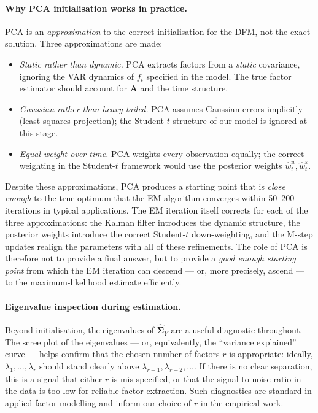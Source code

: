 \documentclass[11pt, a4paper, oneside]{article}
\newcommand{\mA}{\mathbf{A}}
\begin{document}
\paragraph{Why PCA initialisation works in practice.}
PCA is an \emph{approximation} to the correct initialisation for the
DFM, not the exact solution. Three approximations are made:
\begin{itemize}[leftmargin=1.5em, itemsep=3pt]
    \item \emph{Static rather than dynamic.} PCA extracts factors
          from a \emph{static} covariance, ignoring the VAR dynamics
          of $f_t$ specified in the model. The true factor estimator
          should account for $\mA$ and the time structure.
    \item \emph{Gaussian rather than heavy-tailed.} PCA assumes
          Gaussian errors implicitly (least-squares projection); the
          Student-$t$ structure of our model is ignored at this
          stage.
    \item \emph{Equal-weight over time.} PCA weights every observation
          equally; the correct weighting in the Student-$t$ framework
          would use the posterior weights $\hat{w}^u_t, \hat{w}^\varepsilon_t$.
\end{itemize}
Despite these approximations, PCA produces a starting point that is
\emph{close enough} to the true optimum that the EM algorithm
converges within 50--200 iterations in typical applications. The
EM iteration itself corrects for each of the three approximations:
the Kalman filter introduces the dynamic structure, the posterior
weights introduce the correct Student-$t$ down-weighting, and the
M-step updates realign the parameters with all of these refinements.
The role of PCA is therefore not to provide a final answer, but to
provide a \emph{good enough starting point} from which the EM
iteration can descend — or, more precisely, ascend — to the
maximum-likelihood estimate efficiently.

\paragraph{Eigenvalue inspection during estimation.}
Beyond initialisation, the eigenvalues of
$\widehat{\boldsymbol{\Sigma}}_Y$ are a useful diagnostic throughout.
The scree plot of the eigenvalues — or, equivalently, the ``variance
explained'' curve — helps confirm that the chosen number of factors
$r$ is appropriate: ideally, $\lambda_1, \ldots, \lambda_r$ should
stand clearly above $\lambda_{r+1}, \lambda_{r+2}, \ldots$. If there
is no clear separation, this is a signal that either $r$ is
mis-specified, or that the signal-to-noise ratio in the data is too
low for reliable factor extraction. Such diagnostics are standard in
applied factor modelling and inform our choice of $r$ in the
empirical work.
\end{document}
